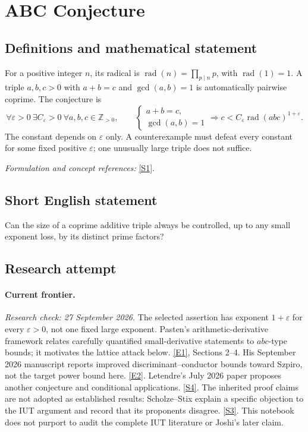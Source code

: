 \documentclass[11pt,a4paper]{article}
\newcommand{\Z}{\mathbb{Z}}
\newcommand{\sref}[2]{\hyperlink{source:#1:#2}{[S#2]}}
\newcommand{\eref}[2]{\hyperlink{extra:#1:#2}{[E#2]}}
\newif\ifshowcatalogue
\newcommand{\cataloguescope}[1]{\ifshowcatalogue
 \paragraph{Exact scope in the supplied catalogue.}
 \begin{quote}\small #1\end{quote}\fi}
\begin{document}
\setcounter{section}{0}
\clearpage
\section*{\texorpdfstring{ABC Conjecture}{ABC Conjecture}}\label{statement}
\subsection{Definitions and mathematical statement}
For a positive integer $n$, its radical is $\operatorname{rad}(n)=\prod_{p\mid n}p$, with $\operatorname{rad}(1)=1$. A triple $a,b,c>0$ with $a+b=c$ and $\gcd(a,b)=1$ is automatically pairwise coprime. The conjecture is
\[
 \forall\varepsilon>0\ \exists C_\varepsilon>0\ \forall a,b,c\in\Z_{>0},\qquad
 \begin{cases}a+b=c,\\\gcd(a,b)=1\end{cases}
 \Longrightarrow c<C_\varepsilon\operatorname{rad}(abc)^{1+\varepsilon}.
\]
The constant depends on $\varepsilon$ only. A counterexample must defeat every constant for some fixed positive $\varepsilon$; one unusually large triple does not suffice.
\par\smallskip\textit{Formulation and concept references:} \sref{statement}{1}.
\cataloguescope{Prove that for every epsilon > 0, there exists a constant C(epsilon) such that for all coprime positive integers a + b = c, c < C(epsilon) rad(abc)\textasciicircum{}\{1+epsilon\}.}
\subsection{Short English statement}
Can the size of a coprime additive triple always be controlled, up to any small exponent loss, by its distinct prime factors?
\subsection{Research attempt}
\paragraph{Current frontier.}
\textit{Research check: 27 September 2026.}
The selected assertion has exponent $1+\varepsilon$ for every
$\varepsilon>0$, not one fixed large exponent. Pasten's arithmetic-derivative
framework relates carefully quantified small-derivative statements to
$abc$-type bounds; it motivates the lattice attack below.
\eref{statement}{1}, Sections 2--4. His September 2026 manuscript reports
improved discriminant--conductor bounds toward Szpiro, not the target
power bound here. \eref{statement}{2}. Letendre's July 2026 paper proposes
another conjecture and conditional applications. \sref{statement}{4}.
The inherited proof claims are not adopted as established results:
Scholze--Stix explain a specific objection to the IUT argument and record
that its proponents disagree. \sref{statement}{3}. This notebook does not purport
to audit the complete IUT literature or Joshi's later claim.
\end{document}
